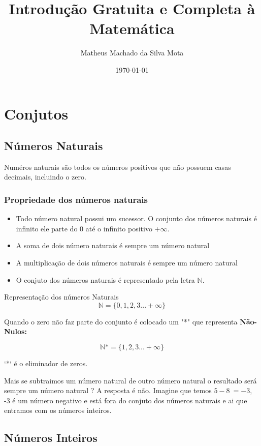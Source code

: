 \documentclass[letterpaper]{book}
\title{Introdução Gratuita e Completa à Matemática}
\author{Matheus Machado da Silva Mota}
\date{\today}
\begin{document}
\maketitle

\tableofcontents
\chapter{Conjutos}

\section{Números Naturais}
Numéros naturais são todos os números positivos que não possuem casas decimais, incluindo o zero.


\subsection{Propriedade dos números naturais}


\begin{itemize}
\item Todo número natural possui um sucessor.
O conjunto dos números naturais é infinito ele parte do 0 até o infinito positivo $+\infty$.
\item A soma de dois número naturais é sempre um número natural
\item A multiplicação de dois números naturais é sempre um número natural
\item O conjuto dos números naturais é representado pela letra \(\mathbb{N}\).
\end{itemize}


Representação dos números Naturais
\[\mathbb{N} = \{0,1,2,3...+\infty\}\]

\vspace{0.5em}
Quando o zero não faz parte do conjunto é colocado um "*" que representa \textbf{Não-Nulos:}


\[\mathbb{N}* = \{1, 2, 3...+ \infty \}\]

`*` é o eliminador de zeros.

Mais se subtraimos um número natural de outro número natural o resultado será sempre um número natural ? A resposta é não.  Imagine que temos \(5-8\ = -3\), -3 é um número negativo e está fora do conjuto dos números naturais e ai que entramos com os números inteiros.

\section{Números Inteiros}
\end{document}
